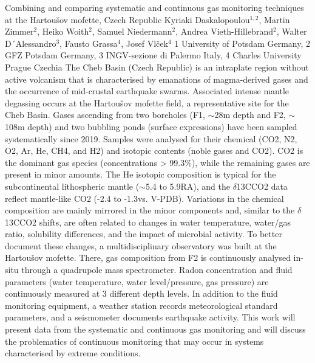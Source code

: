 \begin{conf-abstract}
{Combining and comparing systematic and continuous gas monitoring techniques at the Hartoušov mofette, Czech Republic}
{Kyriaki Daskalopoulou$^{1,2}$, Martin Zimmer$^{2}$, Heiko Woith$^{2}$, Samuel Niedermann$^{2}$, Andrea Vieth-Hillebrand$^{2}$, Walter D´Alessandro$^{3}$, Fausto Grassa$^{4}$, Josef Vlček$^{4}$}
{1 University of Potsdam Germany, 2 GFZ Potsdam Germany, 3 INGV-sezione di Palermo Italy, 4 Charles University Prague Czechia}
{The Cheb Basin (Czech Republic) is an intraplate region without active volcanism that is characterised by emanations of magma-derived gases and the occurrence of mid-crustal earthquake swarms. Associated intense mantle degassing occurs at the Hartoušov mofette field, a representative site for the Cheb Basin. Gases ascending from two boreholes (F1, $\sim$28m depth and F2, $\sim$108m depth) and two bubbling ponds (surface expressions) have been sampled systematically since 2019. Samples were analysed for their chemical (CO2, N2, O2, Ar, He, CH4, and H2) and isotopic contents (noble gases and CO2). CO2 is the dominant gas species (concentrations > 99.3\%), while the remaining gases are present in minor amounts. The He isotopic composition is typical for the subcontinental lithospheric mantle ($\sim$5.4 to 5.9RA), and the $\delta$13CCO2 data reflect mantle-like CO2 (-2.4 to -1.3\permil vs. V-PDB). Variations in the chemical composition are mainly mirrored in the minor components and, similar to the $\delta$13CCO2 shifts, are often related to changes in water temperature, water/gas ratio, solubility differences, and the impact of microbial activity. To better document these changes, a multidisciplinary observatory was built at the Hartoušov mofette. There, gas composition from F2 is continuously analysed in-situ through a quadrupole mass spectrometer. Radon concentration and fluid parameters (water temperature, water level/pressure, gas pressure) are continuously measured at 3 different depth levels. In addition to the fluid monitoring equipment, a weather station records meteorological standard parameters, and a seismometer documents earthquake activity. This work will present data from the systematic and continuous gas monitoring and will discuss the problematics of continuous monitoring that may occur in systems characterised by extreme conditions.}
\end{conf-abstract}
